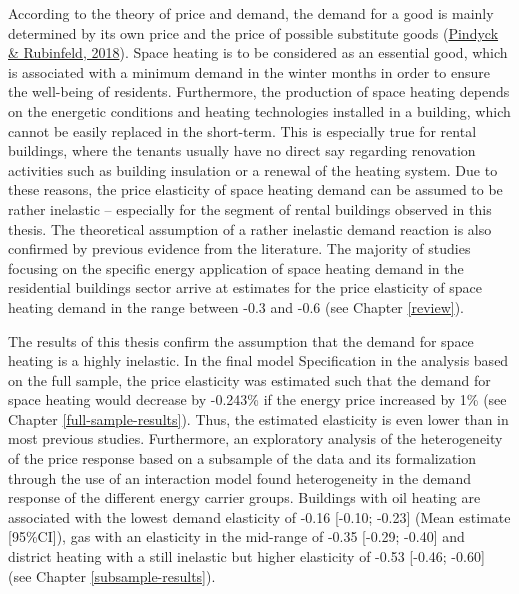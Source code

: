 \documentclass[12pt,twoside]{reedthesis}
\begin{document}
According to the theory of price and demand, the demand for a good is mainly determined by its own price and the price of possible substitute goods (\protect\hyperlink{ref-pindyck_rubinfeld18}{Pindyck \& Rubinfeld, 2018}). Space heating is to be considered as an essential good, which is associated with a minimum demand in the winter months in order to ensure the well-being of residents. Furthermore, the production of space heating depends on the energetic conditions and heating technologies installed in a building, which cannot be easily replaced in the short-term. This is especially true for rental buildings, where the tenants usually have no direct say regarding renovation activities such as building insulation or a renewal of the heating system. Due to these reasons, the price elasticity of space heating demand can be assumed to be rather inelastic -- especially for the segment of rental buildings observed in this thesis. The theoretical assumption of a rather inelastic demand reaction is also confirmed by previous evidence from the literature. The majority of studies focusing on the specific energy application of space heating demand in the residential buildings sector arrive at estimates for the price elasticity of space heating demand in the range between -0.3 and -0.6 (see Chapter \ref{review}).

The results of this thesis confirm the assumption that the demand for space heating is a highly inelastic. In the final model Specification in the analysis based on the full sample, the price elasticity was estimated such that the demand for space heating would decrease by -0.243\% if the energy price increased by 1\% (see Chapter \ref{full-sample-results}). Thus, the estimated elasticity is even lower than in most previous studies. Furthermore, an exploratory analysis of the heterogeneity of the price response based on a subsample of the data and its formalization through the use of an interaction model found heterogeneity in the demand response of the different energy carrier groups. Buildings with oil heating are associated with the lowest demand elasticity of -0.16 {[}-0.10; -0.23{]} (Mean estimate {[}95\%CI{]}), gas with an elasticity in the mid-range of -0.35 {[}-0.29; -0.40{]} and district heating with a still inelastic but higher elasticity of -0.53 {[}-0.46; -0.60{]} (see Chapter \ref{subsample-results}).
\end{document}
